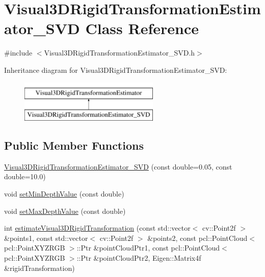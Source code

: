 \hypertarget{class_visual3_d_rigid_transformation_estimator___s_v_d}{
\section{Visual3DRigidTransformationEstimator\_\-SVD Class Reference}
\label{class_visual3_d_rigid_transformation_estimator___s_v_d}
}


{\ttfamily \#include $<$Visual3DRigidTransformationEstimator\_\-SVD.h$>$}

Inheritance diagram for Visual3DRigidTransformationEstimator\_\-SVD:\begin{figure}[H]
\begin{center}
\leavevmode
\includegraphics[height=2.000000cm]{class_visual3_d_rigid_transformation_estimator___s_v_d}
\end{center}
\end{figure}
\subsection*{Public Member Functions}
\begin{DoxyCompactItemize}
\item 
\hyperlink{class_visual3_d_rigid_transformation_estimator___s_v_d_ac5a8b46d9f825bd77a68ae9218e480bb}{Visual3DRigidTransformationEstimator\_\-SVD} (const double=0.05, const double=10.0)
\item 
void \hyperlink{class_visual3_d_rigid_transformation_estimator___s_v_d_a14b1d5d2222d41ac059f4f567fb41339}{setMinDepthValue} (const double)
\item 
void \hyperlink{class_visual3_d_rigid_transformation_estimator___s_v_d_a5d94cd8297bc8ea6eefe4cf996153294}{setMaxDepthValue} (const double)
\item 
int \hyperlink{class_visual3_d_rigid_transformation_estimator___s_v_d_a6033ab7c16772b318d7c951474f42047}{estimateVisual3DRigidTransformation} (const std::vector$<$ cv::Point2f $>$ \&points1, const std::vector$<$ cv::Point2f $>$ \&points2, const pcl::PointCloud$<$ pcl::PointXYZRGB $>$::Ptr \&pointCloudPtr1, const pcl::PointCloud$<$ pcl::PointXYZRGB $>$::Ptr \&pointCloudPtr2, Eigen::Matrix4f \&rigidTransformation)
\end{DoxyCompactItemize}
